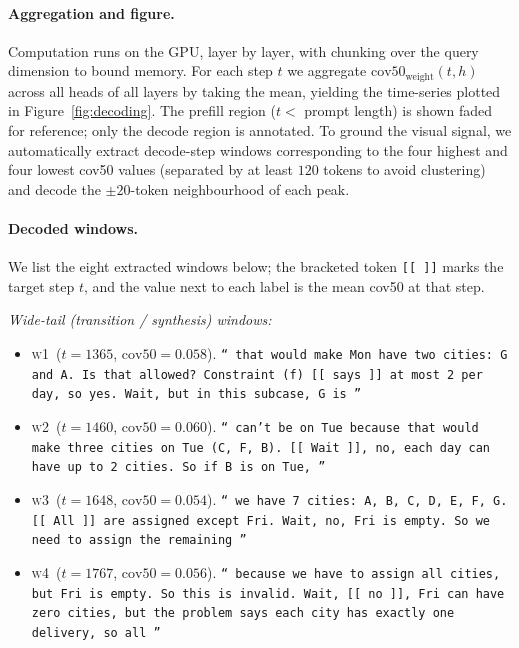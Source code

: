 \paragraph{Aggregation and figure.}
Computation runs on the GPU, layer by layer, with chunking over the query
dimension to bound memory. For each step $t$ we aggregate
$\mathrm{cov50}_{\text{weight}}(t,h)$ across all heads of all layers by taking
the mean, yielding the time-series plotted in Figure~\ref{fig:decoding}. The
prefill region ($t < $ prompt length) is shown faded for reference; only the
decode region is annotated. To ground the visual signal, we automatically
extract decode-step windows corresponding to the four highest and four lowest
cov50 values (separated by at least $120$ tokens to avoid clustering) and
decode the $\pm 20$-token neighbourhood of each peak.

\paragraph{Decoded windows.}
We list the eight extracted windows below; the bracketed token \texttt{[[\,]]}
marks the target step $t$, and the value next to each label is the mean
cov50 at that step.

\textit{Wide-tail (transition / synthesis) windows:}
\begin{itemize}\itemsep1pt
  \item \textsc{w1} \,($t{=}1365$, $\mathrm{cov50}{=}0.058$).
    \texttt{``\,that would make Mon have two cities: G and A. Is that
    allowed? Constraint (f) [[\,says\,]] at most 2 per day, so yes. Wait,
    but in this subcase, G is\,''}
  \item \textsc{w2} \,($t{=}1460$, $\mathrm{cov50}{=}0.060$).
    \texttt{``\,can't be on Tue because that would make three cities on Tue
    (C, F, B). [[\,Wait\,]], no, each day can have up to 2 cities. So if B
    is on Tue,\,''}
  \item \textsc{w3} \,($t{=}1648$, $\mathrm{cov50}{=}0.054$).
    \texttt{``\,we have 7 cities: A, B, C, D, E, F, G. [[\,All\,]] are
    assigned except Fri. Wait, no, Fri is empty. So we need to assign the
    remaining\,''}
  \item \textsc{w4} \,($t{=}1767$, $\mathrm{cov50}{=}0.056$).
    \texttt{``\,because we have to assign all cities, but Fri is empty. So
    this is invalid. Wait, [[\,no\,]], Fri can have zero cities, but the
    problem says each city has exactly one delivery, so all\,''}
\end{itemize}

